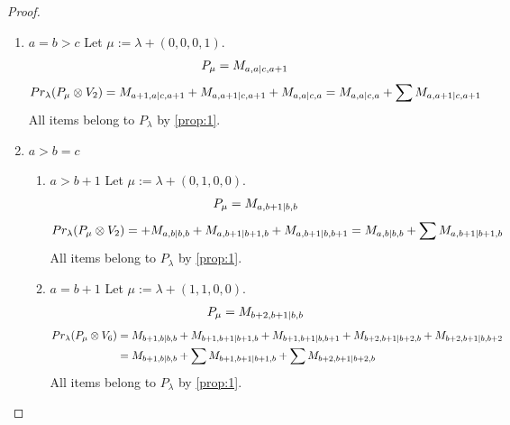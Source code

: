 \begin{proof}
\begin{enumerate}
  \item $a=b>c$
      Let $\mu:=\lambda + (0,0,0,1) $. 
\begin{equation}\notag
  \begin{aligned}
      P_{\mu} = M_{a,a|c,a+1}
  \end{aligned}
\end{equation}
\begin{equation}\notag
  \begin{aligned}
    Pr_{\lambda}(P_\mu \otimes V_2) =
M_{a+1,a|c,a+1}
+M_{a,a+1|c,a+1}
+M_{a,a|c,a} 
= M_{a,a|c,a}
+\sum M_{a,a+1|c,a+1}
  \end{aligned}
\end{equation}
All items belong to $P_\lambda$ by \cref{prop:1}.


  \item $a>b=c$
    \begin{enumerate}
      \item $a>b+1$
        Let $\mu:=\lambda + (0,1,0,0) $. 
\begin{equation}\notag
  \begin{aligned}
      P_{\mu} = M_{a,b+1|b,b}
  \end{aligned}
\end{equation}
\begin{equation}\notag
  \begin{aligned}
    Pr_{\lambda}(P_\mu \otimes V_2) =
+M_{a,b|b,b}
+M_{a,b+1|b+1,b}
+M_{a,b+1|b,b+1} 
= M_{a,b|b,b}
+\sum M_{a,b+1|b+1,b}
  \end{aligned}
\end{equation}
All items belong to $P_\lambda$ by \cref{prop:1}.

      \item $a=b+1$
        Let $\mu:=\lambda + (1,1,0,0) $. 
\begin{equation}\notag
  \begin{aligned}
      P_{\mu} = M_{b+2,b+1|b,b}
  \end{aligned}
\end{equation}
\begin{equation}\notag
  \begin{aligned}
    Pr_{\lambda}(P_\mu \otimes V_6) &=
M_{b+1,b|b,b}
+M_{b+1,b+1|b+1,b}
+M_{b+1,b+1|b,b+1}
+M_{b+2,b+1|b+2,b}
+M_{b+2,b+1|b,b+2} \\
                                    &= 
 M_{b+1,b|b,b}
+\sum M_{b+1,b+1|b+1,b}
+\sum M_{b+2,b+1|b+2,b}
  \end{aligned}
\end{equation}
All items belong to $P_\lambda$ by \cref{prop:1}.
    \end{enumerate}


\end{enumerate}
\end{proof}
